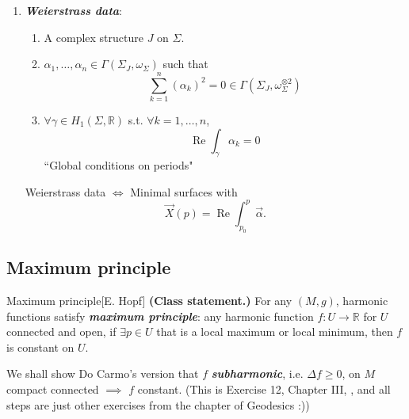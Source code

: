 \begin{enumerate}
\begin{claim}
\end{claim}
\item \textit{\textbf{Weierstrass data}}:
	\begin{enumerate}
	\item A complex structure \(J\) on \(\Sigma\).
	\item \(\alpha_1,\ldots,\alpha_n \in \Gamma(\Sigma_J,\omega_\Sigma)\) such that
		\[\sum_{k=1}^n(\alpha_k)^2=0 \in \Gamma(\Sigma_J,\omega_\Sigma^{\otimes 2})\]
	\item \(\forall \gamma \in H_1(\Sigma,\mathbb{R})\) s.t. \(\forall k=1,\ldots,n\),
		\[\operatorname{Re} \int_\gamma \alpha_k=0\]
		``Global conditions on periods"
	\end{enumerate}
\begin{claim}\leavevmode
Weierstrass data \(\iff\) Minimal surfaces with
\[\vec{X}(p)=\operatorname{Re}\int_{p_0}^p \vec{\alpha}.\]
\end{claim}
\end{enumerate}
\subsection{Maximum principle}

\begin{thing7}{Maximum principle}[E. Hopf]\leavevmode
\textbf{(Class statement.)} For any \((M,g)\), harmonic functions satisfy \textit{\textbf{maximum principle}}: any harmonic function \(f:U \to \mathbb{R}\) for \(U\) connected and open, if \(\exists p \in U\) that is a local maximum or local minimum, then \(f\) is constant on \(U\).

We shall show Do Carmo's version that \(f\) \textit{\textbf{subharmonic}}, i.e. \(\Delta f\geq 0\), on \(M\) compact connected \(\implies\) \(f\) constant. (This is Exercise 12, Chapter III, \cite{doc}, and all steps are just other exercises from the chapter of Geodesics :))
\end{thing7}

